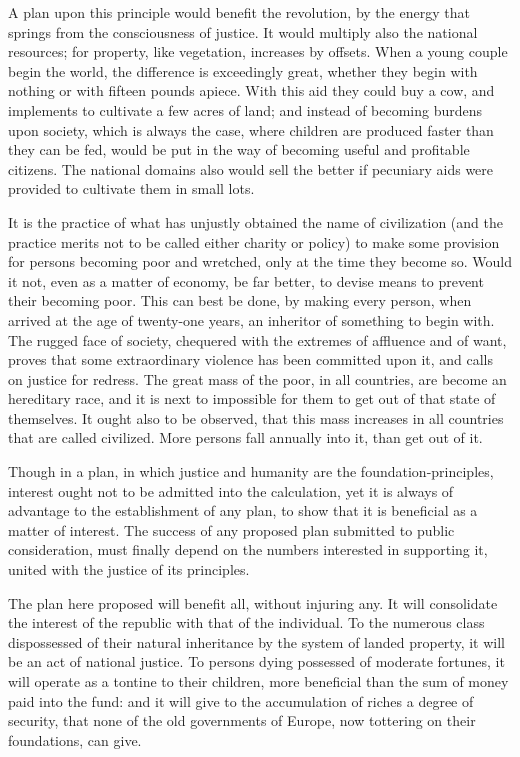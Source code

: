 A plan upon this principle would benefit the revolution, by the energy that springs from the consciousness of justice. It would multiply also the national resources; for property, like vegetation, increases by offsets. When a young couple begin the world, the difference is exceedingly great, whether they begin with nothing or with fifteen pounds apiece. With this aid they could buy a cow, and implements to cultivate a few acres of land; and instead of becoming burdens upon society, which is always the case, where children are produced faster than they can be fed, would be put in the way of becoming useful and profitable citizens. The national domains also would sell the better if pecuniary aids were provided to cultivate them in small lots.

It is the practice of what has unjustly obtained the name of civilization (and the practice merits not to be called either charity or policy) to make some provision for persons becoming poor and wretched, only at the time they become so. Would it not, even as a matter of economy, be far better, to devise means to prevent their becoming poor. This can best be done, by making every person, when arrived at the age of twenty-one years, an inheritor of something to begin with. The rugged face of society, chequered with the extremes of affluence and of want, proves that some extraordinary violence has been committed upon it, and calls on justice for redress. The great mass of the poor, in all countries, are become an hereditary race, and it is next to impossible for them to get out of that state of themselves. It ought also to be observed, that this mass increases in all countries that are called civilized. More persons fall annually into it, than get out of it.

Though in a plan, in which justice and humanity are the foundation-principles, interest ought not to be admitted into the calculation, yet it is always of advantage to the establishment of any plan, to show that it is beneficial as a matter of interest. The success of any proposed plan submitted to public consideration, must finally depend on the numbers interested in supporting it, united with the justice of its principles.

The plan here proposed will benefit all, without injuring any. It will consolidate the interest of the republic with that of the individual. To the numerous class dispossessed of their natural inheritance by the system of landed property, it will be an act of national justice. To persons dying possessed of moderate fortunes, it will operate as a tontine to their children, more beneficial than the sum of money paid into the fund: and it will give to the accumulation of riches a degree of security, that none of the old governments of Europe, now tottering on their foundations, can give.

